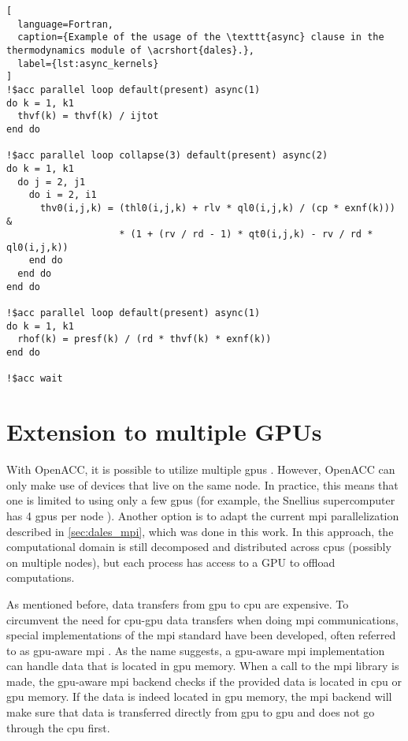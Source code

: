 \begin{lstlisting}[
  language=Fortran,
  caption={Example of the usage of the \texttt{async} clause in the thermodynamics module of \acrshort{dales}.},
  label={lst:async_kernels}
]
!$acc parallel loop default(present) async(1)
do k = 1, k1
  thvf(k) = thvf(k) / ijtot
end do

!$acc parallel loop collapse(3) default(present) async(2)
do k = 1, k1
  do j = 2, j1
    do i = 2, i1 
      thv0(i,j,k) = (thl0(i,j,k) + rlv * ql0(i,j,k) / (cp * exnf(k))) &
                    * (1 + (rv / rd - 1) * qt0(i,j,k) - rv / rd * ql0(i,j,k))
    end do
  end do
end do

!$acc parallel loop default(present) async(1)
do k = 1, k1
  rhof(k) = presf(k) / (rd * thvf(k) * exnf(k))
end do

!$acc wait
\end{lstlisting}
\section{Extension to multiple GPUs}
With OpenACC, it is possible to utilize multiple \acrshort{gpu}s \citep{farberParallelProgrammingOpenACC2017}. However, OpenACC can only make use of devices that live on the same node. In practice, this means that one is limited to using only a few \acrshort{gpu}s (for example, the Snellius supercomputer has 4 \acrshort{gpu}s per node \citep{surfSnelliusHardwareFile}). Another option is to adapt the current \acrshort{mpi} parallelization described in \autoref{sec:dales_mpi}, which was done in this work. In this approach, the computational domain is still decomposed and distributed across \acrshort{cpu}s (possibly on multiple nodes), but each process has access to a GPU to offload computations. 

As mentioned before, data transfers from \acrshort{gpu} to \acrshort{cpu} are expensive. To circumvent the need for \acrshort{cpu}-\acrshort{gpu} data transfers when doing \acrshort{mpi} communications, special implementations of the \acrshort{mpi} standard have been developed, often referred to as \acrshort{gpu}-aware \acrshort{mpi} \citep{potluriEfficientInternodeMPI2013}. As the name suggests, a \acrshort{gpu}-aware \acrshort{mpi} implementation can handle data that is located in \acrshort{gpu} memory. When a call to the \acrshort{mpi} library is made, the \acrshort{gpu}-aware \acrshort{mpi} backend checks if the provided data is located in \acrshort{cpu} or \acrshort{gpu} memory. If the data is indeed located in \acrshort{gpu} memory, the \acrshort{mpi} backend will make sure that data is transferred directly from \acrshort{gpu} to \acrshort{gpu} and does not go through the \acrshort{cpu} first.

